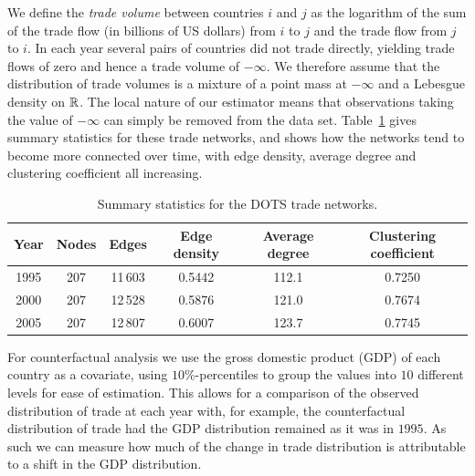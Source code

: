 We define the \emph{trade volume} between countries
$i$ and $j$ as the logarithm of the sum of
the trade flow (in billions of US dollars)
from $i$ to $j$
and the trade flow from $j$ to $i$.
In each year several pairs of countries
did not trade directly, yielding trade flows of zero
and hence a trade volume of $-\infty$.
We therefore assume that the distribution of trade volumes
is a mixture of a point mass at $-\infty$ and a
Lebesgue density on $\mathbb{R}$.
The local nature of our estimator means that
observations taking the value of $-\infty$
can simply be removed from the data set.
Table~\ref{tab:trade_network_stats}
gives summary statistics for these trade networks,
and shows how the networks tend to become more connected over time,
with edge density, average degree and clustering coefficient
all increasing.
%
%
%
%
\begin{table}[ht]
  \caption{Summary statistics for the DOTS trade networks.}
  \label{tab:trade_network_stats}
  \vspace{-1em}
  \begin{center}
    \begin{tabular}{|c|c|c|c|c|c|}
      \hline
      Year
      & Nodes
      & Edges
      & Edge density
      & Average degree
      & Clustering coefficient \\
      \hline
      1995 & 207 & 11\,603 & 0.5442 & 112.1 & 0.7250 \\
      2000 & 207 & 12\,528 & 0.5876 & 121.0 & 0.7674 \\
      2005 & 207 & 12\,807 & 0.6007 & 123.7 & 0.7745 \\
      \hline
    \end{tabular}
  \end{center}
  \vspace{-2em}
\end{table}

For counterfactual analysis we use the
gross domestic product (GDP) of each country as a
covariate, using $10\%$-percentiles to group the values into
$10$ different levels for ease of estimation.
This allows for a comparison of the observed distribution of trade at each year
with, for example, the counterfactual distribution of trade
had the GDP distribution remained as it was in $1995$.
As such we can measure how much of the change in trade
distribution is attributable
to a shift in the GDP distribution.

